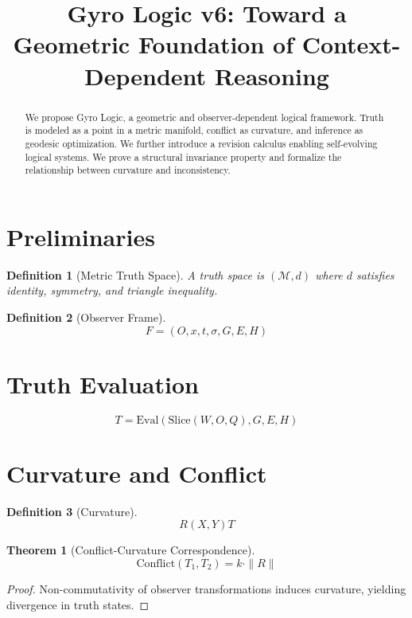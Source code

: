 \documentclass[11pt]{article}
\title{Gyro Logic v6: Toward a Geometric Foundation of Context-Dependent Reasoning}
\author{}
\date{}
\newtheorem{definition}{Definition}
\newtheorem{theorem}{Theorem}
\begin{document}
\maketitle

\begin{abstract}
We propose Gyro Logic, a geometric and observer-dependent logical framework. Truth is modeled as a point in a metric manifold, conflict as curvature, and inference as geodesic optimization. We further introduce a revision calculus enabling self-evolving logical systems. We prove a structural invariance property and formalize the relationship between curvature and inconsistency.
\end{abstract}

\section{Preliminaries}

\begin{definition}[Metric Truth Space]
A truth space is $(\mathcal{M}, d)$ where $d$ satisfies identity, symmetry, and triangle inequality.
\end{definition}

\begin{definition}[Observer Frame]
\[
F = (O, x, t, \sigma, G, E, H)
\]
\end{definition}

\section{Truth Evaluation}

\[
T = \mathrm{Eval}(\mathrm{Slice}(W,O,Q), G, E, H)
\]

\section{Curvature and Conflict}

\begin{definition}[Curvature]
\[
R(X,Y)T
\]
\end{definition}

\begin{theorem}[Conflict-Curvature Correspondence]
\[
\mathrm{Conflict}(T_1,T_2) = k \cdot \|R\|
\]
\end{theorem}

\begin{proof}
Non-commutativity of observer transformations induces curvature, yielding divergence in truth states.
\end{proof}
\end{document}
